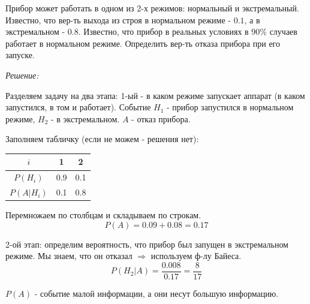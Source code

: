 \begin{exmp}
	Прибор может работать в одном из 2-х режимов: нормальный и экстремальный. Известно, что вер-ть выхода из строя в нормальном режиме - $0.1$, а в экстремальном - $0.8$. Известно, что прибор в реальных условиях в $90\%$ случаев работает в нормальном режиме. Определить вер-ть отказа прибора при его запуске.
	
	\textit{Решение:}
	
	Разделяем задачу на два этапа: 1-ый - в каком режиме запускает аппарат (в каком запустился, в том и работает). Событие $H_1$ - прибор запустился в нормальном режиме, $H_2$ - в экстремальном. $A$ - отказ прибора.
	
	Заполняем табличку (если не можем - решения нет):
	\begin{table}[H]
		\begin{tabular}{|c|c|c|}
			\hline
			$i$        & 1   & 2   \\ \hline
			$P(H_i)$   & 0.9 & 0.1 \\ \hline
			$P(A|H_i)$ & 0.1 & 0.8 \\ \hline
		\end{tabular}
	\end{table}

	Перемножаем по столбцам и складываем по строкам.
	\[ P(A) = 0.09 + 0.08 = 0.17 \]

	2-ой этап: определим вероятность, что прибор был запущен в экстремальном режиме. Мы знаем, что он отказал $\Rightarrow$ используем ф-лу Байеса.
	\[ P(H_2|A) = \dfrac{0.008}{0.17} = \dfrac{8}{17} \]
	
	\begin{remark}
		$P(A)$ - событие малой информации, а они несут большую информацию.
	\end{remark}
\end{exmp}

